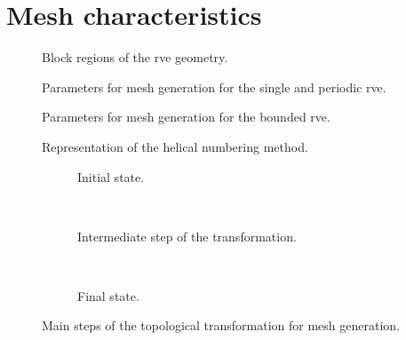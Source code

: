 \documentclass[a4paper, twoside,12pt, abstract]{scrartcl} %
\begin{document}
\section{Mesh characteristics}

\begin{figure}[!h]
\centering
  \caption{Block regions of the \acrshort{rve} geometry.}
  \label{fig:mesh_regions}
\end{figure}

\begin{figure}[!h]
\centering
  \caption{Parameters for mesh generation for the single and periodic \acrshort{rve}.}
  \label{fig:mesh_param_single}
\end{figure}

\begin{figure}[!h]
\centering
  \caption{Parameters for mesh generation for the bounded \acrshort{rve}.}
  \label{fig:mesh_param_bounded}
\end{figure}

\begin{figure}[!h]
\centering
  \caption{Representation of the helical numbering method.}
  \label{fig:helical_numbering}
\end{figure}

\begin{figure}[!h]
\centering
    \begin{subfigure}[b]{0.3\textheight}
        \caption{Initial state.}
        \label{fig:init_state}
    \end{subfigure}\\
 \begin{subfigure}[b]{0.3\textheight}
        \caption{Intermediate step of the transformation.}
        \label{fig:inter_state}
    \end{subfigure}\\
 \begin{subfigure}[b]{0.3\textheight}
        
        \caption{Final state.}
        \label{fig:final_state}
    \end{subfigure}
  \caption{Main steps of the topological transformation for mesh generation.}
  \label{fig:topo_transf_steps}
\end{figure}
\end{document}
